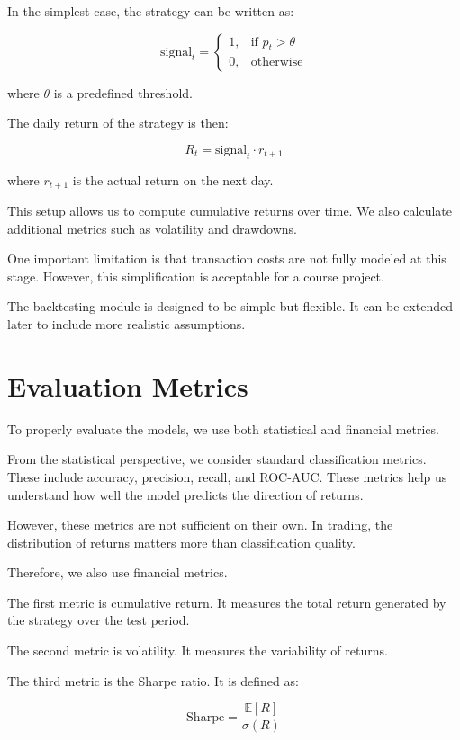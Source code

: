 \documentclass[12pt,a4paper]{article}
\begin{document}
In the simplest case, the strategy can be written as:

\[
\text{signal}_t =
\begin{cases}
1, & \text{if } p_t > \theta \\
0, & \text{otherwise}
\end{cases}
\]

where $\theta$ is a predefined threshold.

The daily return of the strategy is then:

\[
R_t = \text{signal}_t \cdot r_{t+1}
\]

where $r_{t+1}$ is the actual return on the next day.

This setup allows us to compute cumulative returns over time. We also calculate additional metrics such as volatility and drawdowns.

One important limitation is that transaction costs are not fully modeled at this stage. However, this simplification is acceptable for a course project.

The backtesting module is designed to be simple but flexible. It can be extended later to include more realistic assumptions.

\section{Evaluation Metrics}

To properly evaluate the models, we use both statistical and financial metrics.

From the statistical perspective, we consider standard classification metrics. These include accuracy, precision, recall, and ROC-AUC. These metrics help us understand how well the model predicts the direction of returns.

However, these metrics are not sufficient on their own. In trading, the distribution of returns matters more than classification quality.

Therefore, we also use financial metrics.

The first metric is cumulative return. It measures the total return generated by the strategy over the test period.

The second metric is volatility. It measures the variability of returns.

The third metric is the Sharpe ratio. It is defined as:

\[
\text{Sharpe} = \frac{\mathbb{E}[R]}{\sigma(R)}
\]
\end{document}
